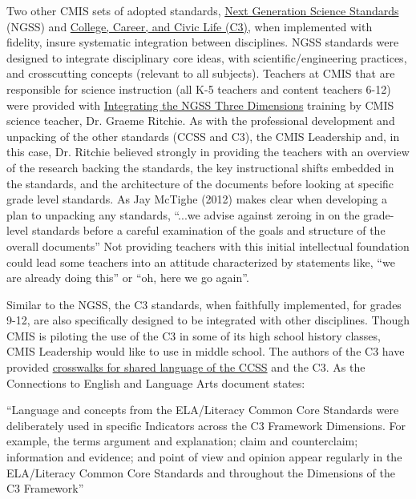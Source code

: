 \documentclass{report}
\begin{document}
\begin{findings}
Two other CMIS sets of adopted standards, \href{https://drive.google.com/a/cmis.ac.th/file/d/0B71_pYxcTLo-eUtQZE9DLTFvYUE/view?usp=sharing}{Next Generation Science Standards} (NGSS) and \href{https://drive.google.com/a/cmis.ac.th/file/d/0ByVFfrm0zfolbG9hN21kR2FXZVU/view?usp=sharing}{College, Career, and Civic Life (C3)}, when implemented with fidelity, insure systematic integration between disciplines. NGSS standards were designed to integrate disciplinary core ideas, with scientific/engineering practices, and crosscutting concepts (relevant to all subjects). Teachers at CMIS that are responsible for science instruction (all K-5 teachers and content teachers 6-12) were provided with \href{https://drive.google.com/drive/folders/0B7TDqZfXoqRrTjh1UFNhZjdqN28?usp=sharing}{Integrating the NGSS Three Dimensions} training by CMIS science teacher, Dr. Graeme Ritchie. As with the professional development and unpacking of the other standards (CCSS and C3), the CMIS Leadership and, in this case,  Dr. Ritchie believed strongly in providing the teachers with an overview of the research backing the standards, the key instructional shifts embedded in the standards, and the architecture of the documents before looking at specific grade level standards. As Jay McTighe (2012) makes clear when developing a plan to unpacking any standards, ``...we advise against zeroing in on the grade-level standards before a careful examination of the goals and structure of the overall documents'' Not providing teachers with this initial intellectual foundation could lead some teachers into an attitude characterized by statements like, ``we are already doing this'' or ``oh, here we go again''. 

Similar to the NGSS, the C3 standards, when faithfully implemented, for grades 9-12, are also specifically designed to be integrated with other disciplines. Though CMIS is piloting the use of the C3 in some of its high school history classes, CMIS Leadership would like to use in middle school. The authors of the C3 have provided \href{https://drive.google.com/drive/folders/0ByVFfrm0zfolN1pEVER5dW9zY0U}{crosswalks for shared language of the CCSS} and the C3. As the Connections to English and Language Arts document states:

``Language and concepts from the ELA/Literacy Common Core Standards were deliberately used in specific Indicators across the C3 Framework Dimensions. For example, the terms argument and explanation; claim and counterclaim; information and evidence; and point of view and opinion appear regularly in the ELA/Literacy Common Core Standards and throughout the Dimensions of the C3 Framework''


\end{findings}
\end{document}
